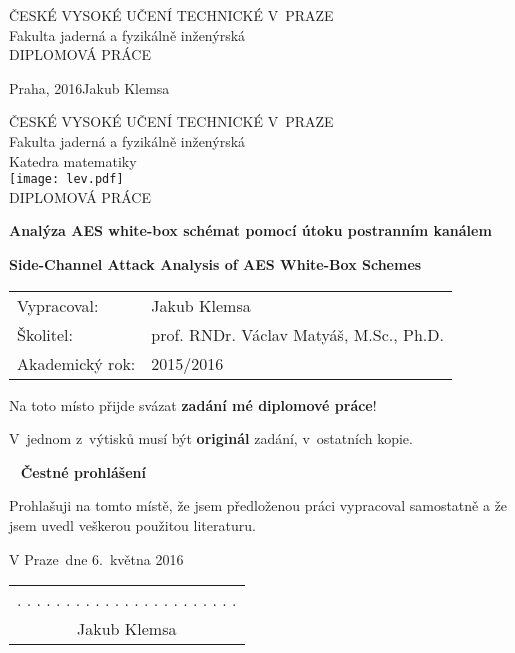 \documentclass[11pt,a4paper,twoside,openright]{report}
\theoremstyle{definition}
\theoremstyle{remark}
\newcommand{\cvut}{ČESKÉ VYSOKÉ UČENÍ TECHNICKÉ V~PRAZE}
\newcommand{\fjfi}{Fakulta jaderná a fyzikálně inženýrská}
\newcommand{\km}{Katedra matematiky}
\newcommand{\TYPPRACE}{DIPLOMOVÁ PRÁCE}
\newcommand{\mePrace}{mé diplomové práce}
\newcommand{\nazevcz}{Analýza AES white-box schémat pomocí útoku postranním kanálem}
\newcommand{\nazeven}{Side-Channel Attack Analysis of AES White-Box Schemes}
\newcommand{\autor}{Jakub Klemsa}
\newcommand{\vedouci}{prof. RNDr. Václav Matyáš, M.Sc., Ph.D.}
\newcommand{\rok}{2016}
\newcommand{\akadRok}{2015/2016}
\newcommand{\misto}{Praha}
\newcommand{\VMiste}{V Praze}
\begin{document}
\begin{titlepage}
	
	\thispagestyle{empty}
	\begin{center}
		{\Large \cvut \\[12pt] \fjfi \\[260pt]}
		{\Huge \TYPPRACE}
	\end{center}
	\vfill
	{
		\Large \misto, \rok \hfill \autor
	}
	\cleardoublepage
	
	
	\thispagestyle{empty}
	\begin{center}
		{\Large \cvut \\[10pt] \fjfi \\[10pt] \km \\[40pt]}
		\texttt{[image: lev.pdf]} \\[100pt]
		
		{\LARGE \TYPPRACE \\[60pt]}
		
		{\Large\bf \nazevcz \\[30pt]}
		
		{\Large\bf \nazeven}
	\end{center}
	\vfill
	{
		\Large
		\begin{tabular}{ll}
		Vypracoval: & \autor\\[3pt]
		Školitel: & \vedouci\\[3pt]
		Akademický rok: & \akadRok
		\end{tabular}
	}
	\cleardoublepage
	
	
	\thispagestyle{empty}
	\Large
	Na toto místo přijde svázat \textbf{zadání \mePrace}!
	
	\vspace{4mm}
	V~jednom z~výtisků musí být \textbf{originál} zadání, v~ostatních kopie.
	\normalsize
	\cleardoublepage
	
	
	\thispagestyle{empty}
	~
	\vfill
	\noindent\textbf{Čestné prohlášení}
	\vspace{0.5cm}
	
	\noindent
	Prohlašuji na tomto místě, že jsem předloženou práci vypracoval samostatně a že jsem uvedl veškerou použitou literaturu.
	\vspace{1.5cm}
	
	\noindent
	\vspace{5mm}\VMiste ~dne 6.\ května 2016\hfill
		\begin{tabular}{c}
		. . . . . . . . . . . . . . . . . . . . . . .\\
		\autor
		\end{tabular}
	\cleardoublepage
	

\end{titlepage}
\end{document}
